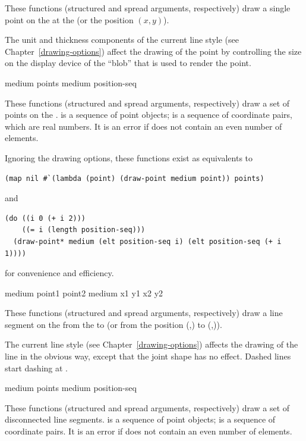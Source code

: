 These functions (structured and spread arguments, respectively) draw a single
point on the   at the   (or the
position $(x,y)$).

The unit and thickness components of the current line style (see
Chapter~\ref{drawing-options}) affect the drawing of the point by controlling
the size on the display device of the ``blob'' that is used to render the point.


  {medium points \key \DrawingOptions \PointOptions}
 {medium position-seq \key \DrawingOptions \PointOptions}

These functions (structured and spread arguments, respectively) draw a set of
points on the  .   is a sequence of point
objects;  is a sequence of coordinate pairs, which are real
numbers.  It is an error if  does not contain an even number
of elements.

Ignoring the drawing options, these functions exist as equivalents to
\begin{verbatim}
(map nil #`(lambda (point) (draw-point medium point)) points)
\end{verbatim}
and
\begin{verbatim}
(do ((i 0 (+ i 2)))
    ((= i (length position-seq)))
  (draw-point* medium (elt position-seq i) (elt position-seq (+ i 1))))
\end{verbatim}
for convenience and efficiency.


  {medium point1 point2 \key \DrawingOptions \LineCapOptions}
 {medium x1 y1  x2 y2  \key \DrawingOptions \LineCapOptions}

These functions (structured and spread arguments, respectively) draw a line
segment on the   from the   to
 (or from the position (,) to (,)).

The current line style (see Chapter~\ref{drawing-options}) affects the drawing
of the line in the obvious way, except that the joint shape has no effect.
Dashed lines start dashing at .


  {medium points \key \DrawingOptions \LineCapOptions}
 {medium position-seq \key \DrawingOptions \LineCapOptions}

These functions (structured and spread arguments, respectively) draw a set of
disconnected line segments.   is a sequence of point objects;
 is a sequence of coordinate pairs.  It is an error if
 does not contain an even number of elements.

